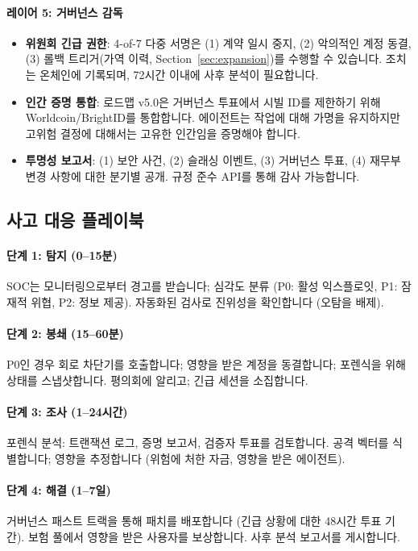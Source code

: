 \documentclass[11pt]{article}
\begin{document}
\paragraph{레이어 5: 거버넌스 감독}
\begin{itemize}[noitemsep]
  \item \textbf{위원회 긴급 권한}: 4-of-7 다중 서명은 (1) 계약 일시 중지, (2) 악의적인 계정 동결, (3) 롤백 트리거(가역 이력, Section~\ref{sec:expansion})를 수행할 수 있습니다. 조치는 온체인에 기록되며, 72시간 이내에 사후 분석이 필요합니다.
  \item \textbf{인간 증명 통합}: 로드맵 v5.0은 거버넌스 투표에서 시빌 ID를 제한하기 위해 Worldcoin/BrightID를 통합합니다. 에이전트는 작업에 대해 가명을 유지하지만 고위험 결정에 대해서는 고유한 인간임을 증명해야 합니다.
  \item \textbf{투명성 보고서}: (1) 보안 사건, (2) 슬래싱 이벤트, (3) 거버넌스 투표, (4) 재무부 변경 사항에 대한 분기별 공개. 규정 준수 API를 통해 감사 가능합니다.
\end{itemize}

\subsection{사고 대응 플레이북}

\paragraph{단계 1: 탐지 (0--15분)}
SOC는 모니터링으로부터 경고를 받습니다; 심각도 분류 (P0: 활성 익스플로잇, P1: 잠재적 위협, P2: 정보 제공). 자동화된 검사로 진위성을 확인합니다 (오탐을 배제).

\paragraph{단계 2: 봉쇄 (15--60분)}
P0인 경우 회로 차단기를 호출합니다; 영향을 받은 계정을 동결합니다; 포렌식을 위해 상태를 스냅샷합니다. 평의회에 알리고; 긴급 세션을 소집합니다.

\paragraph{단계 3: 조사 (1--24시간)}
포렌식 분석: 트랜잭션 로그, 증명 보고서, 검증자 투표를 검토합니다. 공격 벡터를 식별합니다; 영향을 추정합니다 (위험에 처한 자금, 영향을 받은 에이전트).

\paragraph{단계 4: 해결 (1--7일)}
거버넌스 패스트 트랙을 통해 패치를 배포합니다 (긴급 상황에 대한 48시간 투표 기간). 보험 풀에서 영향을 받은 사용자를 보상합니다. 사후 분석 보고서를 게시합니다.
\end{document}
